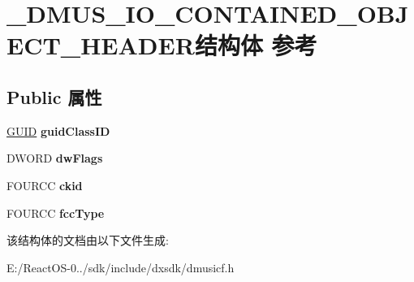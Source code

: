 \hypertarget{struct___d_m_u_s___i_o___c_o_n_t_a_i_n_e_d___o_b_j_e_c_t___h_e_a_d_e_r}{}\section{\+\_\+\+D\+M\+U\+S\+\_\+\+I\+O\+\_\+\+C\+O\+N\+T\+A\+I\+N\+E\+D\+\_\+\+O\+B\+J\+E\+C\+T\+\_\+\+H\+E\+A\+D\+E\+R结构体 参考}
\label{struct___d_m_u_s___i_o___c_o_n_t_a_i_n_e_d___o_b_j_e_c_t___h_e_a_d_e_r}
\subsection*{Public 属性}
\begin{DoxyCompactItemize}
\item 
\mbox{\label{struct___d_m_u_s___i_o___c_o_n_t_a_i_n_e_d___o_b_j_e_c_t___h_e_a_d_e_r_a7879ee9935094f47f34e79c1062da8ee}} 
\hyperlink{interface_g_u_i_d}{G\+U\+ID} {\bfseries guid\+Class\+ID}
\item 
\mbox{\label{struct___d_m_u_s___i_o___c_o_n_t_a_i_n_e_d___o_b_j_e_c_t___h_e_a_d_e_r_a7acf5068dcca403683b37861c5d0b9dc}} 
D\+W\+O\+RD {\bfseries dw\+Flags}
\item 
\mbox{\label{struct___d_m_u_s___i_o___c_o_n_t_a_i_n_e_d___o_b_j_e_c_t___h_e_a_d_e_r_ad81a5df1402dceebbb1f44bea3b3091d}} 
F\+O\+U\+R\+CC {\bfseries ckid}
\item 
\mbox{\label{struct___d_m_u_s___i_o___c_o_n_t_a_i_n_e_d___o_b_j_e_c_t___h_e_a_d_e_r_a0dade3cf7c3e9725181dfa0d3d3fc020}} 
F\+O\+U\+R\+CC {\bfseries fcc\+Type}
\end{DoxyCompactItemize}


该结构体的文档由以下文件生成\+:\begin{DoxyCompactItemize}
\item 
E\+:/\+React\+O\+S-\/0../sdk/include/dxsdk/dmusicf.\+h\end{DoxyCompactItemize}
